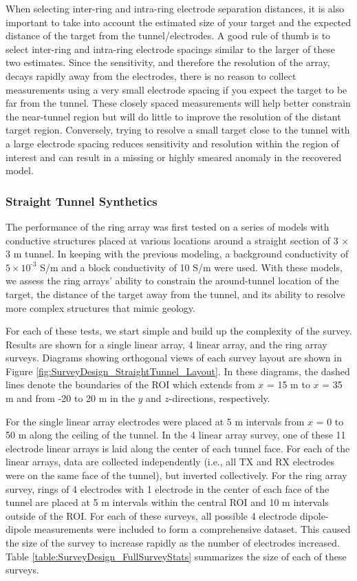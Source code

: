 \documentclass[preprint,authoryear,12pt]{elsarticle}
\begin{document}
When selecting inter-ring and intra-ring electrode separation distances, it is also important to take into account the estimated size of your target and the expected distance of the target from the tunnel/electrodes. A good rule of thumb is to select inter-ring and intra-ring electrode spacings similar to the larger of these two estimates. Since the sensitivity, and therefore the resolution of the array, decays rapidly away from the electrodes, there is no reason to collect measurements using a very small electrode spacing if you expect the target to be far from the tunnel. These closely spaced measurements will help better constrain the near-tunnel region but will do little to improve the resolution of the distant target region. Conversely, trying to resolve a small target close to the tunnel with a large electrode spacing reduces sensitivity and resolution within the region of interest and can result in a missing or highly smeared anomaly in the recovered model.


\subsubsection{Straight Tunnel Synthetics}
\label{sec:RingArray_Development_Straight_Synth_Intro}
The performance of the ring array was first tested on a series of models with conductive structures placed at various locations around a straight section of 3 $\times$ 3 m tunnel. In keeping with the previous modeling, a background conductivity of $5 \times 10^{\text{-3}}$ S/m and a block conductivity of 10 S/m were used. With these models, we assess the ring arrays' ability to constrain the around-tunnel location of the target, the distance of the target away from the tunnel, and its ability to resolve more complex structures that mimic geology.

For each of these tests, we start simple and build up the complexity of the survey. Results are shown for a single linear array, 4 linear array, and the ring array surveys. Diagrams showing orthogonal views of each survey layout are shown in Figure \ref{fig:SurveyDesign_StraightTunnel_Layout}. In these diagrams, the dashed lines denote the boundaries of the ROI which extends from $x$ = 15 m to $x$ = 35 m and from -20 to 20 m in the $y$ and $z$-directions, respectively.

For the single linear array electrodes were placed at 5 m intervals from $x$ = 0 to 50 m along the ceiling of the tunnel. In the 4 linear array survey, one of these 11 electrode linear arrays is laid along the center of each tunnel face. For each of the linear arrays, data are collected independently (i.e., all TX and RX electrodes were on the same face of the tunnel), but inverted collectively. For the ring array survey, rings of 4 electrodes with 1 electrode in the center of each face of the tunnel are placed at 5 m intervals within the central ROI and 10 m intervals outside of the ROI. For each of these surveys, all possible 4 electrode dipole-dipole measurements were included to form a comprehensive dataset. This caused the size of the survey to increase rapidly as the number of electrodes increased. Table \ref{table:SurveyDesign_FullSurveyStats} summarizes the size of each of these surveys.
\end{document}
